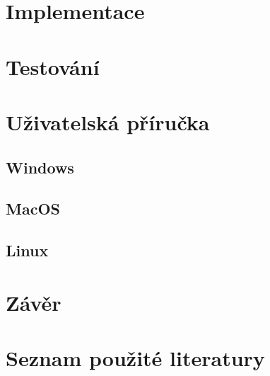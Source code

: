 \documentclass[12pt]{article}
\begin{document}
\section{Implementace}

\section{Testování}

\section{Uživatelská příručka}

\subsection{Windows}

\subsection{MacOS}

\subsection{Linux}

\section{Závěr}

\section{Seznam použité literatury}
\end{document}
